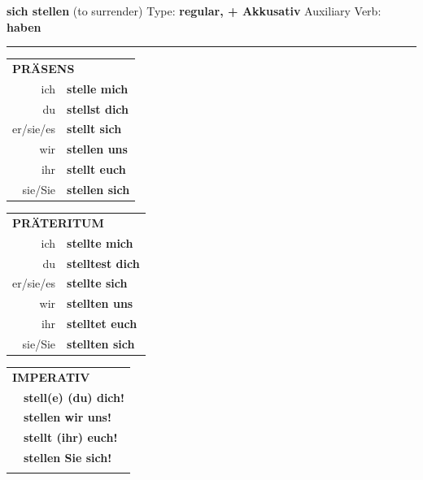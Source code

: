 \documentclass[10pt,a4paper]{revtex4-2}
\begin{document}
\begin{verbbox-acc}
        {\Large \bf sich stellen} (to surrender) \hfill Type: \textbf{regular, + Akkusativ} \hfill Auxiliary Verb: \textbf{haben} 
    
       \vspace{5pt}

    \hrule
    
    \vspace{5pt}

  \begin{tabular}{rl}
     \multicolumn{2}{l}{\textbf{PRÄSENS} }\\
    ich & \textbf{stelle mich}\\
    du & \textbf{stellst dich}\\
    er/sie/es & \textbf{stellt sich}\\
    wir & \textbf{stellen uns}\\
    ihr & \textbf{stellt euch}\\
    sie/Sie & \textbf{stellen sich}\\
  \end{tabular}
  \hfill
     \begin{tabular}{rl}
    \multicolumn{2}{l}{\textbf{PRÄTERITUM} }\\
    ich & \textbf{stellte mich}\\
    du & \textbf{stelltest dich}\\
    er/sie/es & \textbf{stellte sich}\\
    wir & \textbf{stellten uns}\\
    ihr & \textbf{stelltet euch}\\
    sie/Sie & \textbf{stellten sich}\\
  \end{tabular}
  \hfill
  \begin{tabular}{rl}
     \multicolumn{2}{l}{\textbf{IMPERATIV} }\\
   & \textbf{stell(e) (du) dich!}\\
   & \textbf{stellen wir uns!}\\
   & \textbf{stellt (ihr) euch!}\\
   & \textbf{stellen Sie sich!}\\
   & \vspace{10pt}
  \end{tabular}

    \vspace{10pt}


\end{verbbox-acc}
\end{document}
